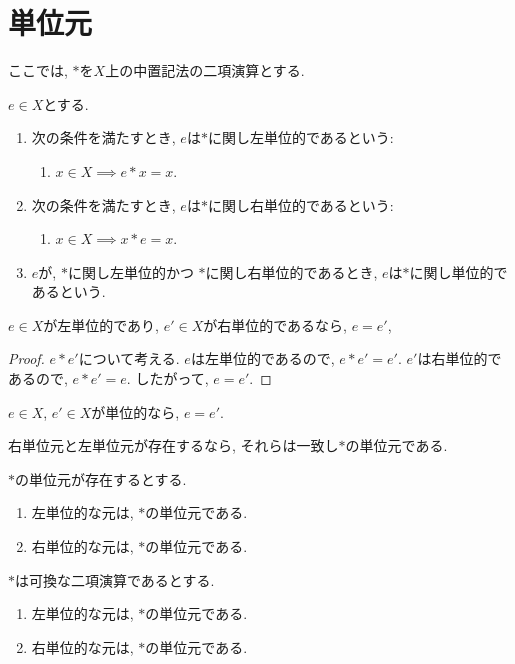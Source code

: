\section{単位元}
ここでは,
$\ast$を$X$上の中置記法の二項演算とする.
\begin{definition}
  $e\in X$とする.
  \begin{enumerate}
  \item
    次の条件を満たすとき,
    $e$は$\ast$に関し左単位的であるという:
    \begin{enumerate}
    \item $x\in X\implies e\ast x=x$.
    \end{enumerate}
  \item
    次の条件を満たすとき,
    $e$は$\ast$に関し右単位的であるという:
    \begin{enumerate}
    \item $x\in X\implies x\ast e=x$.
    \end{enumerate}
  \item
    $e$が,
    $\ast$に関し左単位的かつ
    $\ast$に関し右単位的であるとき,
    $e$は$\ast$に関し単位的であるという.
  \end{enumerate}
\end{definition}
\begin{lemma}
  $e\in X$が左単位的であり,
  $e'\in X$が右単位的であるなら,
  $e=e'$,
\end{lemma}
\begin{proof}
  $e\ast e'$について考える.
  $e$は左単位的であるので, $e\ast e'=e'$.
  $e'$は右単位的であるので, $e\ast e'=e$.
  したがって, $e=e'$.
\end{proof}
\begin{cor}
\label{cor:uniq:unit}
  $e\in X$, $e'\in X$が単位的なら,
  $e=e'$.
\end{cor}


\begin{cor}
  右単位元と左単位元が存在するなら,
  それらは一致し$\ast$の単位元である.
\end{cor}
\begin{cor}
  $\ast$の単位元が存在するとする.
  \begin{enumerate}
  \item 左単位的な元は, $\ast$の単位元である.
  \item 右単位的な元は, $\ast$の単位元である.
  \end{enumerate}
\end{cor}
\begin{cor}
  $\ast$は可換な二項演算であるとする.
  \begin{enumerate}
  \item 左単位的な元は, $\ast$の単位元である.
  \item 右単位的な元は, $\ast$の単位元である.
  \end{enumerate}
\end{cor}


